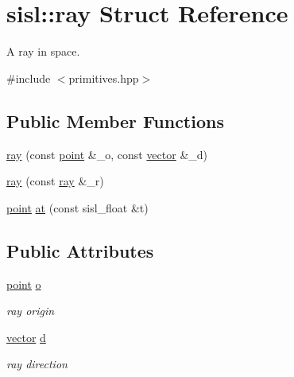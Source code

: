 \hypertarget{structsisl_1_1ray}{}\section{sisl\+:\+:ray Struct Reference}
\label{structsisl_1_1ray}


A ray in space.  




{\ttfamily \#include $<$primitives.\+hpp$>$}

\subsection*{Public Member Functions}
\begin{DoxyCompactItemize}
\item 
\hyperlink{structsisl_1_1ray_a4a18a538fceb31b4fe52b336a0b5f78a}{ray} (const \hyperlink{namespacesisl_afaf80b1234035c1dbd3d570c96c6a63a}{point} \&\+\_\+o, const \hyperlink{namespacesisl_a2069bd5374a9be042ff3ce3306d41e1a}{vector} \&\+\_\+d)
\item 
\hyperlink{structsisl_1_1ray_a497629918619817a4f0ca31591a3382b}{ray} (const \hyperlink{structsisl_1_1ray}{ray} \&\+\_\+r)
\item 
\hyperlink{namespacesisl_afaf80b1234035c1dbd3d570c96c6a63a}{point} \hyperlink{structsisl_1_1ray_ae32b430c114c83d70ffa2a091ee6c753}{at} (const sisl\+\_\+float \&t)
\end{DoxyCompactItemize}
\subsection*{Public Attributes}
\begin{DoxyCompactItemize}
\item 
\mbox{\label{structsisl_1_1ray_acb0bb9002b19124ac808c226ae380204}} 
\hyperlink{namespacesisl_afaf80b1234035c1dbd3d570c96c6a63a}{point} \hyperlink{structsisl_1_1ray_acb0bb9002b19124ac808c226ae380204}{o}
\begin{DoxyCompactList}\small\item\em ray origin \end{DoxyCompactList}\item 
\mbox{\label{structsisl_1_1ray_a1ceb0dbf48e5d852979bbced79551d52}} 
\hyperlink{namespacesisl_a2069bd5374a9be042ff3ce3306d41e1a}{vector} \hyperlink{structsisl_1_1ray_a1ceb0dbf48e5d852979bbced79551d52}{d}
\begin{DoxyCompactList}\small\item\em ray direction \end{DoxyCompactList}\end{DoxyCompactItemize}


